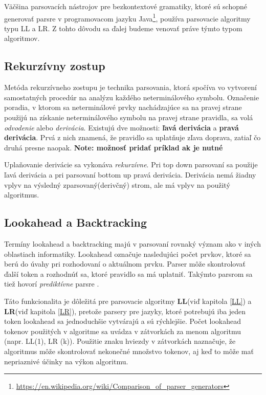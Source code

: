 Väčšina parsovacích nástrojov pre bezkontextové gramatiky, ktoré sú schopné generovať parsre v programovacom jazyku Java\footnote{\url{https://en.wikipedia.org/wiki/Comparison_of_parser_generators}}, používa parsovacie algoritmy typu LL a LR. Z tohto dôvodu sa ďalej budeme venovať práve týmto typom algoritmov.

\subsection{Rekurzívny zostup}\label{recursive-descent}
Metóda rekurzívneho zostupu je technika parsovania, ktorá spočíva vo vytvorení samostatných procedúr na analýzu každého neterminálového symbolu. \cite{CVUT:program_language} Označenie poradia, v ktorom sa neterminálové prvky nachádzajúce sa na pravej strane použijú na získanie neterminálového symbolu na pravej strane pravidla, sa volá \textit{odvodenie} alebo \textit{derivácia}. Existujú dve možnosti: \textbf{ľavá derivácia} a \textbf{pravá derivácia}. Prvá z nich znamená, že pravidlo sa uplatňuje zľava doprava, zatiaľ čo druhá presne naopak. 
\textbf{Note: možnosť pridať príklad ak je nutné}

Uplaňovanie derivácie sa vykonáva \textit{rekurzívne}. Pri top down parsovaní sa použije ľavá derivácia a pri parsovaní bottom up pravá derivácia. Derivácia nemá žiadny vplyv na výsledný zparsovaný(derivčný) strom, ale má vplyv na použitý algoritmus.

\subsection{Lookahead a Backtracking}
Termíny lookahead a backtracking majú v parsovaní rovnaký význam ako v iných oblastiach informatiky. Lookahead označuje nasledujúci počet prvkov, ktoré sa berú do úvahy pri rozhodovaní o aktuálnom prvku. Parser môže skontrolovať ďalší token a rozhodnúť sa, ktoré pravidlo sa má uplatniť. Takýmto parsrom sa tiež hovorí \textit{prediktívne} parsre \cite{haberman:parsing_demystified}.

Táto funkcionalita je dôležitá pre parsovacie algoritmy \textbf{LL}(viď kapitola \ref{LL}) a \textbf{LR}(viď kapitola \ref{LR}), pretože parsery pre jazyky, ktoré potrebujú iba jeden token lookahead sa jednoduchšie vytvárajú a sú rýchlejšie. Počet lookahead tokenov použitých v algoritme sa uvádza v zátvorkách za menom algoritmu (napr. LL(1), LR (k)). Použitie znaku hviezdy v zátvorkách naznačuje, že algoritmus môže skontrolovať nekonečné množstvo tokenov, aj keď to môže mať nepriaznivé účinky na výkon algoritmu.\cite{tomassetti:parsing}

